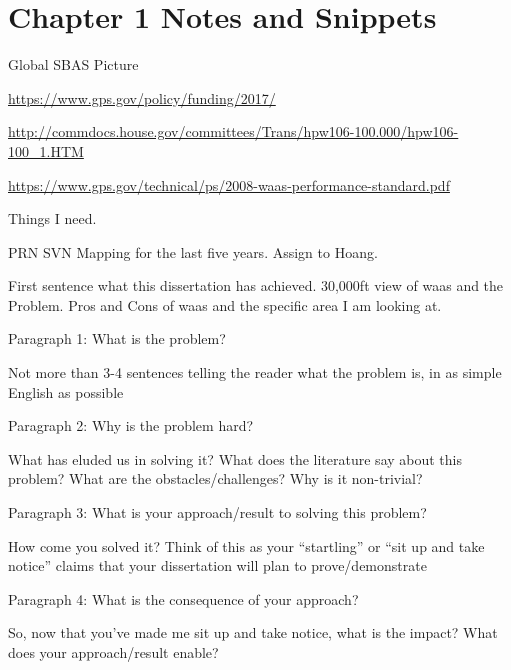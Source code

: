 \section{Chapter 1 Notes and Snippets}

Global SBAS Picture

\href{https://www.gps.gov/policy/funding/2017/}{https://www.gps.gov/policy/funding/2017/}

\href{http://commdocs.house.gov/committees/Trans/hpw106-100.000/hpw106-100\_1.HTM}{http://commdocs.house.gov/committees/Trans/hpw106-100.000/hpw106-100\_1.HTM}

\href{https://www.gps.gov/technical/ps/2008-waas-performance-standard.pdf}{https://www.gps.gov/technical/ps/2008-waas-performance-standard.pdf}

Things I need.

PRN SVN Mapping for the last five years.
Assign to Hoang.


First sentence what this dissertation has achieved.
30,000ft view of \ac{waas} and the Problem. Pros and Cons of \ac{waas} and the specific area I am looking at.

Paragraph 1: What is the problem?

Not more than 3-4 sentences telling the reader what the problem is, in as simple English as possible

Paragraph 2: Why is the problem hard?

What has eluded us in solving it? What does the literature say about this problem? What are the obstacles/challenges? Why is it non-trivial?

Paragraph 3: What is your approach/result to solving this problem?

How come you solved it? Think of this as your “startling” or “sit up and take notice” claims that your dissertation will plan to prove/demonstrate

Paragraph 4: What is the consequence of your approach?

So, now that you’ve made me sit up and take notice, what is the impact? What does your approach/result enable?
~\\



